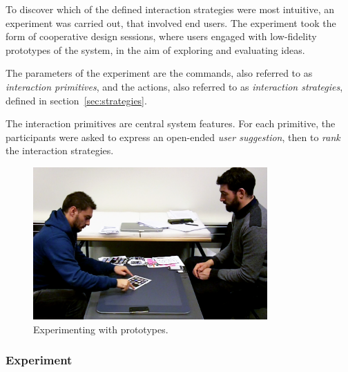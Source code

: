 To discover which of the defined interaction strategies were most intuitive, an experiment was carried out, that involved end users.
The experiment took the form of cooperative design sessions, where users engaged with low-fidelity prototypes of the system, in the aim of exploring and evaluating ideas.

The parameters of the experiment are the commands, also referred to as \emph{interaction primitives}, and the actions, also referred to as \emph{interaction strategies}, defined in section~\ref{sec:strategies}.

The interaction primitives are central system features.
For each primitive, the participants were asked to express an open-ended \emph{user suggestion}, then to \emph{rank} the interaction strategies.

\begin{figure}[htb]
  \centering
    \includegraphics[width=0.8\textwidth]{images/studyScreenshot}
  \caption{Experimenting with prototypes.}
  \label{studyScreenshot}
\end{figure}

\subsubsection{Experiment}

